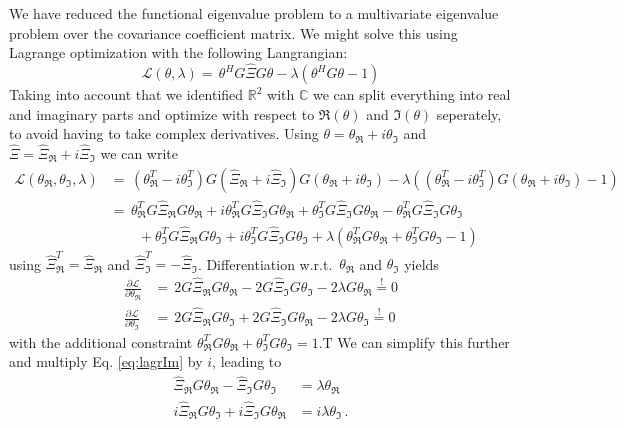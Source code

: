 We have reduced the functional eigenvalue problem to a multivariate eigenvalue problem over the covariance coefficient matrix.
We might solve this using Lagrange optimization with the following Langrangian:
\begin{equation*}
  \mathcal{L}(\theta,\lambda) = \, \theta^H G \hat{\Xi} G \theta - \lambda ( \theta^H G \theta - 1)
\end{equation*}
Taking into account that we identified $\mathbb{R}^2$ with $\mathbb{C}$ we can split everything into real and imaginary parts and optimize with respect to $\Re(\theta)$ and $\Im(\theta)$ seperately, to avoid having to take complex derivatives.
Using $\theta = \theta_\Re + i \theta_\Im$ and $\hat{\Xi} = \hat\Xi_\Re + i \hat\Xi_\Im$ we can write
\begin{align*}
  \mathcal{L}(\theta_\Re,\theta_\Im,\lambda) & = \, 
    (\theta_\Re^T - i \theta_\Im^T) G ( \hat{\Xi}_\Re + i \hat\Xi_\Im ) G ( \theta_\Re + i \theta_\Im )
    - \lambda \left( (\theta_\Re^T - i \theta_\Im^T ) G (\theta_\Re + i \theta_\Im) - 1 \right) \\
  & = \, \theta_\Re^T G \hat\Xi_\Re G \theta_\Re 
    + i \theta_\Re^T G \hat\Xi_\Im G \theta_\Re 
    + \theta_\Im^T G \hat\Xi_\Im G \theta_\Re
    - \theta_\Re^T G \hat\Xi_\Im G \theta_\Im \\
  & \qquad  + \theta_\Im^T G \hat\Xi_\Re G \theta_\Im
    + i \theta_\Im^T G \hat\Xi_\Im G \theta_\Im 
    + \lambda \left( \theta_\Re^T G \theta_\Re + \theta_\Im^T G \theta_\Im - 1 \right)
\end{align*}
using $\hat\Xi_\Re^T = \hat\Xi_\Re$ and $\hat\Xi_\Im^T = - \hat\Xi_\Im$.
Differentiation w.r.t.\ $\theta_\Re$ and $\theta_\Im$ yields
\begin{align}
  \frac{\partial \mathcal{L}}{\partial \theta_\Re} & = \, 
    2G\hat\Xi_\Re G \theta_\Re - 2G\hat\Xi_\Im G \theta_\Im - 2\lambda G\theta_\Re \overset{!}{=} 0 \label{eq:lagrRe}\\
  \frac{\partial \mathcal{L}}{\partial \theta_\Im} & = \,
    2G\hat\Xi_\Re G \theta_\Im + 2G\hat\Xi_\Im G \theta_\Re - 2\lambda G\theta_\Im \overset{!}{=} 0 \label{eq:lagrIm}
\end{align}
with the additional constraint $\theta_\Re^T G \theta_\Re + \theta_\Im^T G \theta_\Im = 1$.T
We can simplify this further and multiply Eq. \ref{eq:lagrIm} by $i$, leading to
\begin{align}
  \hat\Xi_\Re G \theta_\Re - \hat\Xi_\Im G \theta_\Im & = \lambda \theta_\Re\\
  i \hat\Xi_\Re G \theta_\Im + i \hat\Xi_\Im G \theta_\Re & = i \lambda \theta_\Im \,.
\end{align}
